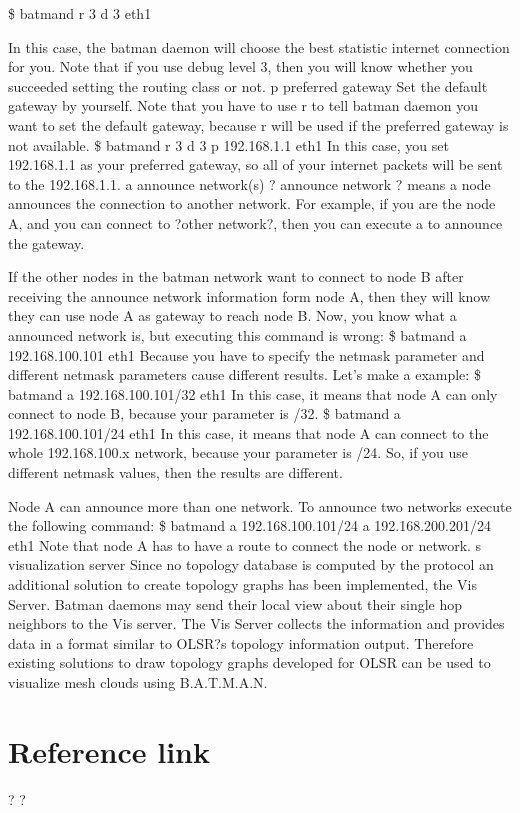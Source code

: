\documentclass[
	12pt,
	a4paper,
	twoside,
	english,
	headsepline,
	footnosepline,
	automark,
	normalheadings,
	openany,
	cleardoubleplain,
	abstracton,
	idxtotoc,
	liststotoc,
	bibtotoc,
 	BCOR8mm,
]{scrartcl}
\begin{document}
\$ batmand  r 3  d 3  eth1

In this case, the batman daemon will choose the best statistic internet connection for you. Note that if you use debug level 3, then you will know whether you succeeded setting the  routing class or not.  p preferred gateway Set the default gateway  by yourself. Note that you have to use  r to tell batman daemon you want to set the default gateway,  because  r will be used if the preferred gateway is not available. \$ batmand  r 3  d 3  p 192.168.1.1 eth1 In this case, you set 192.168.1.1 as your preferred gateway, so all of your internet packets will  be sent to the 192.168.1.1.  a announce network(s) ? announce network ? means a node announces the connection to another network. For example, if you are the node A, and you can connect to ?other network?, then you can  execute  a to announce the gateway.

If the other nodes in the batman network want to connect to node B after receiving the  announce network information form node A, then they will know they can use node A as  gateway to reach node B. Now, you know what a announced network is, but executing this command is wrong: \$ batmand   a 192.168.100.101  eth1  Because you have to specify the netmask parameter and different netmask parameters cause  different results. Let's make a example: \$ batmand   a 192.168.100.101/32  eth1 In this case, it means that node A can only connect to node B, because your parameter is /32.
\$ batmand   a 192.168.100.101/24  eth1 In this case, it means that node A can connect to the whole 192.168.100.x network, because  your parameter is /24. So, if you use different netmask values, then the results are different.

Node A can  announce more than one network. To announce two networks execute the following  command: \$ batmand   a 192.168.100.101/24   a 192.168.200.201/24 eth1  Note that node A has to have a route to connect the node or network.  s visualization server Since no topology database is computed by the protocol an additional solution to create  topology graphs has been implemented, the Vis Server. Batman daemons may send their  local view about their single hop neighbors to the Vis server. The Vis Server collects the  information and provides data in a format similar to OLSR?s topology information output.  Therefore existing solutions to draw topology graphs developed for OLSR can be used to  visualize mesh clouds using B.A.T.M.A.N.

\section{Reference link}
? ?
\end{document}
